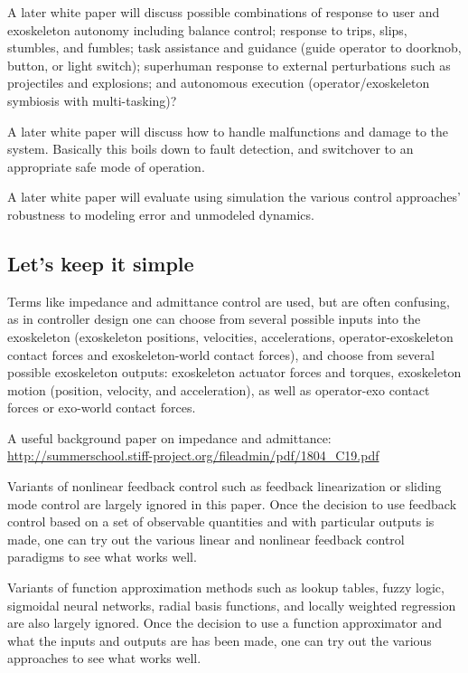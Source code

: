 \documentclass[letterpaper,12pt,fullpage]{article}
\begin{document}
A later white paper will discuss
possible combinations of response to user and exoskeleton
autonomy including balance control; response to trips, slips,
stumbles, and fumbles; task assistance and guidance (guide operator to
doorknob, button, or light switch); superhuman response to external
perturbations such as projectiles and explosions; and autonomous
execution (operator/exoskeleton symbiosis with multi-tasking)?

A later white paper will discuss how to handle malfunctions and damage to the
system. Basically this boils down to fault detection, and switchover to
an appropriate safe mode of operation.

A later white paper will evaluate using simulation
the various control approaches' robustness to modeling error and unmodeled
dynamics.

\subsection{Let's keep it simple}

Terms like impedance and admittance control are used, but are often confusing,
as in controller design one can choose from several possible
inputs into the exoskeleton (exoskeleton positions,
velocities, accelerations, operator-exoskeleton contact forces and
exoskeleton-world contact forces), and choose from several possible exoskeleton
outputs: exoskeleton actuator forces and torques, exoskeleton
motion (position, velocity, and acceleration), as well as operator-exo
contact forces or exo-world contact forces.

A useful background paper on impedance and admittance:\\
\url{http://summerschool.stiff-project.org/fileadmin/pdf/1804_C19.pdf}

Variants of nonlinear feedback control such as feedback linearization or
sliding mode control are largely ignored in this paper.
Once the decision to use feedback control
based on a set of observable quantities and with particular outputs is made,
one can try out the various linear and nonlinear feedback control paradigms
to see what works well.

Variants of function approximation methods such as lookup tables, fuzzy logic,
sigmoidal neural networks, radial basis functions, and locally weighted regression
are also largely ignored. Once the decision to use a function approximator
and what the inputs and outputs are has been made, one can try out the various
approaches to see what works well.
\end{document}
